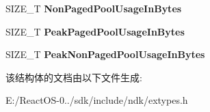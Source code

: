 \begin{DoxyCompactItemize}
S\+I\+Z\+E\+\_\+T {\bfseries Non\+Paged\+Pool\+Usage\+In\+Bytes}
\item 
\mbox{\label{struct___s_y_s_t_e_m___v_e_r_i_f_i_e_r___i_n_f_o_r_m_a_t_i_o_n_a93b604dfeb74f8c217e2e182fb0df5d1}} 
S\+I\+Z\+E\+\_\+T {\bfseries Peak\+Paged\+Pool\+Usage\+In\+Bytes}
\item 
\mbox{\label{struct___s_y_s_t_e_m___v_e_r_i_f_i_e_r___i_n_f_o_r_m_a_t_i_o_n_ae078e2f19911d8b393c075b950898f5c}} 
S\+I\+Z\+E\+\_\+T {\bfseries Peak\+Non\+Paged\+Pool\+Usage\+In\+Bytes}
\end{DoxyCompactItemize}


该结构体的文档由以下文件生成\+:\begin{DoxyCompactItemize}
\item 
E\+:/\+React\+O\+S-\/0../sdk/include/ndk/extypes.\+h\end{DoxyCompactItemize}
